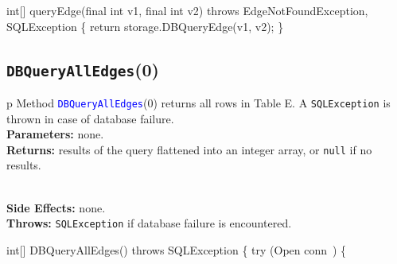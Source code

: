 \nwenddocs{}\endmoddef{}
int[] queryEdge(final int v1, final int v2) throws EdgeNotFoundException, SQLException \{
  return storage.DBQueryEdge(v1, v2);
\}
\eatline
{}\nwendcode{}\nwdocspar
\subsection{\texttt{DBQueryAllEdges}(0)}
\begin{tabular}{p{\textwidth}}
\toprule
{}
Method \textcolor{blue}{{\tt{}\protect{}DBQueryAllEdges}}(0) returns all rows in Table E.
A {\tt{}SQLException} is thrown in case of database failure.\\
\midrule
\textbf{Parameters:} none.\\
\textbf{Returns:} results of the query flattened into an integer array, or
{\tt{}null} if no results.

\\
\textbf{Side Effects:} none.\\
\textbf{Throws:} {\tt{}SQLException} if database failure is encountered.\\
\bottomrule
\end{tabular}
\nwenddocs{}\endmoddef{}
int[] DBQueryAllEdges() throws SQLException \{
  try (\LA{}Open \code{}conn\edoc{}~{\nwtagstyle{}}\RA{}) \{
